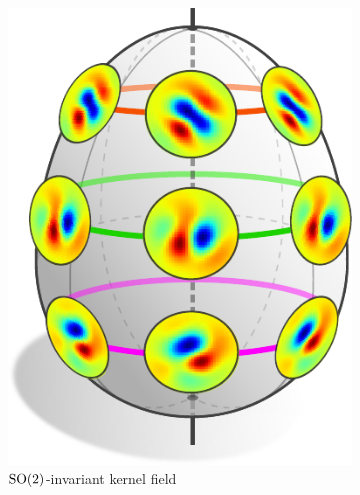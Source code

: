 \begin{figure}
    \hspace{1.ex}
    \begin{subfigure}[b]{0.24\textwidth}
        \includegraphics[width=.92\textwidth]{figures/isometry_egg_intro_symmetric.pdf}
        \vspace*{-.5ex}
        \captionsetup{format=hang, width=.7\textwidth}
        \caption{\small
            $\operatorname{SO}(2)$-invariant kernel field
        }
        \label{fig:isom_invariant_kernel_field_intro_SO2}
    \end{subfigure}
    \hspace*{1.5ex}
    \begin{subfigure}[b]{0.24\textwidth}

\end{subfigure}
\end{figure}
